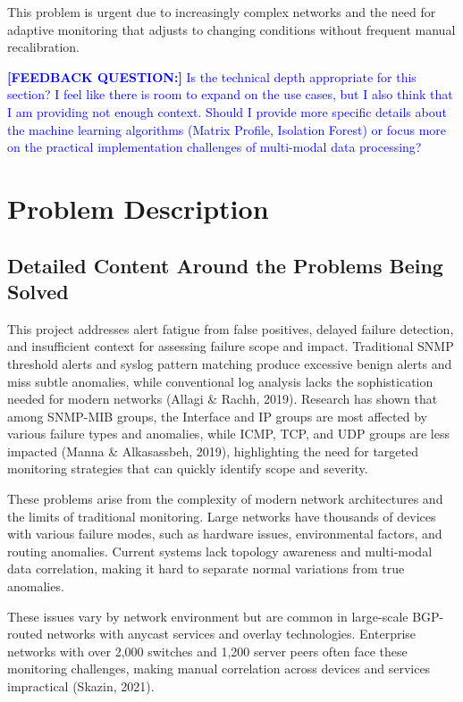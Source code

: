 \documentclass[11pt]{article}
\begin{document}
This problem is urgent due to increasingly complex networks and the need for adaptive monitoring that adjusts to changing conditions without frequent manual recalibration.

\textcolor{blue}{\textbf{[FEEDBACK QUESTION:]} Is the technical depth appropriate for this section? I feel like there is room to expand on the use cases, but I also think that I am providing not enough context. Should I provide more specific details about the machine learning algorithms (Matrix Profile, Isolation Forest) or focus more on the practical implementation challenges of multi-modal data processing?}

\section{Problem Description}

\subsection{Detailed Content Around the Problems Being Solved}

This project addresses alert fatigue from false positives, delayed failure detection, and insufficient context for assessing failure scope and impact. Traditional SNMP threshold alerts and syslog pattern matching produce excessive benign alerts and miss subtle anomalies, while conventional log analysis lacks the sophistication needed for modern networks (Allagi \& Rachh, 2019). Research has shown that among SNMP-MIB groups, the Interface and IP groups are most affected by various failure types and anomalies, while ICMP, TCP, and UDP groups are less impacted (Manna \& Alkasassbeh, 2019), highlighting the need for targeted monitoring strategies that can quickly identify scope and severity.

These problems arise from the complexity of modern network architectures and the limits of traditional monitoring. Large networks have thousands of devices with various failure modes, such as hardware issues, environmental factors, and routing anomalies. Current systems lack topology awareness and multi-modal data correlation, making it hard to separate normal variations from true anomalies.

These issues vary by network environment but are common in large-scale BGP-routed networks with anycast services and overlay technologies. Enterprise networks with over 2,000 switches and 1,200 server peers often face these monitoring challenges, making manual correlation across devices and services impractical (Skazin, 2021).
\end{document}
